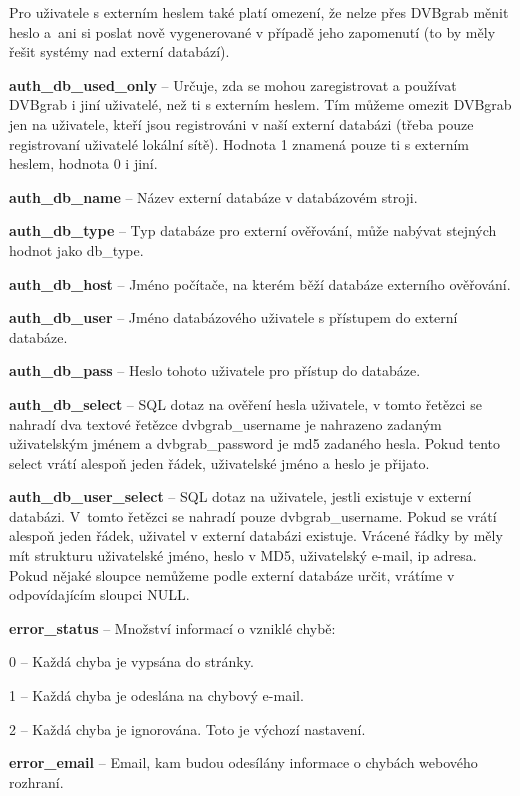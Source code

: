 Pro uživatele s externím heslem také platí omezení, že nelze přes DVBgrab měnit heslo a~ani si poslat nově vygenerované v případě jeho zapomenutí (to by měly řešit systémy nad externí databází).
\item\textbf{auth\_db\_used\_only} -- Určuje, zda se mohou zaregistrovat a používat DVBgrab i jiní uživatelé, než ti s externím heslem. Tím můžeme omezit DVBgrab jen na uživatele, kteří jsou registrováni v naší externí databázi (třeba pouze registrovaní uživatelé lokální sítě). Hodnota 1 znamená pouze ti s externím heslem, hodnota 0 i jiní.
\item\textbf{auth\_db\_name} -- Název externí databáze v databázovém stroji.
\item\textbf{auth\_db\_type} -- Typ databáze pro externí ověřování, může nabývat stejných hodnot jako db\_type.
\item\textbf{auth\_db\_host} -- Jméno počítače, na kterém běží databáze externího ověřování.
\item\textbf{auth\_db\_user} -- Jméno databázového uživatele s přístupem do externí databáze.
\item\textbf{auth\_db\_pass} -- Heslo tohoto uživatele pro přístup do databáze.
\item\textbf{auth\_db\_select} -- SQL dotaz na ověření hesla uživatele, v tomto řetězci se nahradí dva textové řetězce dvbgrab\_username je nahrazeno zadaným uživatelským jménem \linebreak[4] a dvbgrab\_password je md5 zadaného hesla. Pokud tento select vrátí alespoň jeden řádek, uživatelské jméno a heslo je přijato.
\item\textbf{auth\_db\_user\_select} -- SQL dotaz na uživatele, jestli existuje v externí databázi. V~tomto řetězci se nahradí pouze dvbgrab\_username. Pokud se vrátí alespoň jeden řádek, uživatel v externí databázi existuje. Vrácené řádky by měly mít strukturu uživatelské jméno, heslo v MD5, uživatelský e-mail, ip adresa. Pokud nějaké sloupce nemůžeme podle externí databáze určit, vrátíme v odpovídajícím sloupci NULL.
\item\textbf{error\_status} -- Množství informací o vzniklé chybě:
\bitem
\item 0 -- Každá chyba je vypsána do stránky.
\item 1 -- Každá chyba je odeslána na chybový e-mail.
\item 2 -- Každá chyba je ignorována. Toto je výchozí nastavení.
\eitem
\item\textbf{error\_email} -- Email, kam budou odesílány informace o chybách webového rozhraní.
